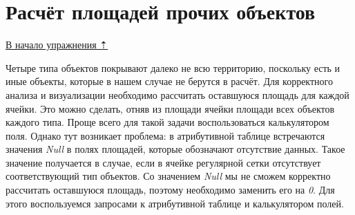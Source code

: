 \documentclass[
  12pt,
]{book}
\begin{document}
\hypertarget{spatrelations-other}{%
\section{Расчёт площадей прочих объектов}\label{spatrelations-other}}

\protect\hyperlink{spatrelations}{В начало упражнения ⇡}

Четыре типа объектов покрывают далеко не всю территорию, поскольку есть и иные объекты, которые в нашем случае не берутся в расчёт. Для корректного анализа и визуализации необходимо рассчитать оставшуюся площадь для каждой ячейки. Это можно сделать, отняв из площади ячейки площади всех объектов каждого типа. Проще всего для такой задачи воспользоваться калькулятором поля. Однако тут возникает проблема: в атрибутивной таблице встречаются значения \emph{Null} в полях площадей, которые обозначают отсутствие данных. Такое значение получается в случае, если в ячейке регулярной сетки отсутствует соответствующий тип объектов. Со значением \emph{Null} мы не сможем корректно рассчитать оставшуюся площадь, поэтому необходимо заменить его на \emph{0}. Для этого воспользуемся запросами к атрибутивной таблице и калькулятором полей.
\end{document}
